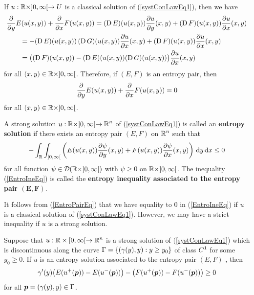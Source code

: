 If $u:\RR\times ]0,\infty[ \to U$ is a classical solution of
(\ref{systConLawEq1}), then we have
\begin{align*}
&\pdfdx{E(u(x,y))}{y} + \pdfdx{F(u(x,y))}{x}
= (\diff E)(u(x,y)) \pdydx{u}{y}(x,y) + (\diff F)(u(x,y)) \pdydx{u}{x}(x,y)  \\
&\qquad = - (\diff E)(u(x,y))\, (\diff G)(u(x,y)) \pdydx{u}{x}(x,y)
+ (\diff F)(u(x,y)) \pdydx{u}{x}(x,y) \\
&\qquad = \big( (\diff F)(u(x,y)) - (\diff E)(u(x,y)) (\diff G)(u(x,y)) \big)
\pdydx{u}{x}(x,y)
\end{align*}
for all $(x,y) \in \RR\times ]0,\infty[$.
Therefore, if $(E,F)$ is an entropy pair, then
\begin{equation} \label{EntroPairEq}
\pdfdx{E(u(x,y))}{y} + \pdfdx{F(u(x,y))}{x} = 0
\end{equation}
for all $(x,y) \in \RR\times ]0,\infty[$.

\begin{defn} \label{dnfEntroSol}
A strong solution
$\DS u:\RR\times ]0,\infty[\to \RR^n$ of (\ref{systConLawEq1})
is called an {\bfseries entropy solution} if there exists an entropy pair $(E,F)$ on
$\DS \RR^n$ such that
\begin{equation} \label{EntroIneEq}
-\int_{\RR}\int_{]0,\infty[}
\left( E(u(x,y)) \pdydx{\psi}{y}(x,y) +
  F(u(x,y)) \pdydx{\psi}{x}(x,y) \right) \dx{y}\dx{x} \leq 0
\end{equation}
for all function $\psi \in \DD(\RR\times]0,\infty[)$ with
$\psi \geq 0$ on $\RR\times]0,\infty[$.  The inequality
(\ref{EntroIneEq}) is called the {\bfseries entropy inequality
associated to the entropy pair $\mathbf{(E,F)}$}.
\end{defn}

It follows from (\ref{EntroPairEq}) that we have equality to $0$ in
(\ref{EntroIneEq}) if $u$ is a classical solution of
(\ref{systConLawEq1}).  However, we may have a strict inequality if
$u$ is a strong solution.

\begin{lemma}
Suppose that $\DS u:\RR\times [0,\infty[ \to \RR^n$ is a
strong solution of
(\ref{systConLawEq1}) which is discontinuous along the curve
$\DS \Gamma = \left\{ (\gamma(y),y) : y \geq y_0 \right\}$ of
class $\DS C^1$ for some $y_0\geq 0$.  If $u$ is an entropy
solution associated to the entropy pair $(E,F)$ \footnotemark, then
\begin{equation} \label{EntrJumpEq}
\gamma'(y) \big( E(u^+(\VEC{p})) - E(u^-(\VEC{p})) \big)
- \big( F(u^+(\VEC{p}))- F(u^-(\VEC{p})) \big) \geq 0
\end{equation}
for all $\VEC{p}=(\gamma(y),y) \in \Gamma$.
\end{lemma}

